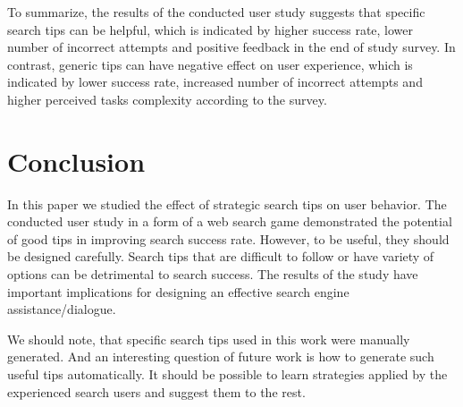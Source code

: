 \documentclass{sig-alternate}
\begin{document}
To summarize, the results of the conducted user study suggests that specific search tips can be helpful, which is indicated by higher success rate, lower number of incorrect attempts and positive feedback in the end of study survey.
In contrast, generic tips can have negative effect on user experience, which is indicated by lower success rate, increased number of incorrect attempts and higher perceived tasks complexity according to the survey.

\section{Conclusion}
In this paper we studied the effect of strategic search tips on user behavior. 
The conducted user study in a form of a web search game demonstrated the potential of good tips in improving search success rate.
However, to be useful, they should be designed carefully.
Search tips that are difficult to follow or have variety of options can be detrimental to search success.
The results of the study have important implications for designing an effective search engine assistance/dialogue.

We should note, that specific search tips used in this work were manually generated.
And an interesting question of future work is how to generate such useful tips automatically.
It should be possible to learn strategies applied by the experienced search users and suggest them to the rest.



%

%
%
\end{document}
